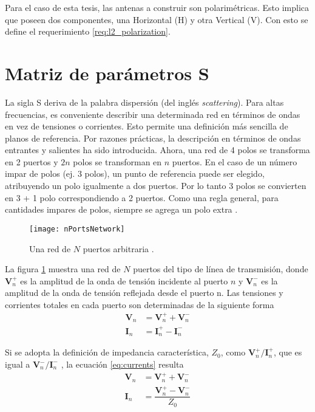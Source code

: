 Para el caso de esta tesis, las antenas a construir son polarimétricas. Esto implica que poseen dos componentes, una Horizontal (H) y otra Vertical (V). Con esto se define el requerimiento \ref{req:l2_polarization}.


\section{Matriz de parámetros S} 

La sigla S deriva de la palabra dispersión (del inglés \textit{scattering}). Para altas frecuencias, es conveniente describir una determinada red en términos de ondas en vez de tensiones o corrientes. Esto permite una definición más sencilla de planos de referencia. Por razones prácticas, la descripción en términos de ondas entrantes y salientes ha sido introducida. Ahora, una red de 4 polos se transforma en 2 puertos y $2n$ polos se transforman en $n$ puertos. En el caso de un número impar de polos (ej. 3 polos), un punto de referencia puede ser elegido, atribuyendo un polo igualmente a dos puertos. Por lo tanto 3 polos se convierten en 3 + 1 polo correspondiendo a 2 puertos. Como una regla general, para cantidades impares de polos, siempre se agrega un polo extra \cite{Caspers}.

\begin{figure}[H]
 \centering
 \texttt{[image: nPortsNetwork]}
 \caption{Una red de $N$ puertos arbitraria \cite{Pozar2012}.}
 \label{fig:nPortsNetwork}
\end{figure}

La figura \ref{fig:nPortsNetwork} muestra una red de $N$ puertos del tipo de línea de transmisión, donde $\bm{V}_n^+$ es la amplitud de la onda de tensión incidente al puerto $n$ y $\bm{V}_n^-$ es la amplitud de la onda de tensión reflejada desde el puerto n. Las tensiones y corrientes totales en cada puerto son determinadas de la siguiente forma
\begin{equation}\label{eq:currents}
\begin{aligned}
  \bm{V}_n &= \bm{V}_n^+ + \bm{V}_n^-\\
  \bm{I}_n &= \bm{I}_n^+ - \bm{I}_n^-
\end{aligned}
\end{equation}

Si se adopta la definición de impedancia característica, $Z_0$, como $\bm{V}_n^+/ \bm{I}_n^+$, que es igual a $\bm{V}_n^-/ \bm{I}_n^-$ \cite{Pozar2012}, la ecuación \ref{eq:currents} resulta
\begin{equation}\label{eq:voltages}
\begin{aligned}
  \bm{V}_n &= \bm{V}_n^+ + \bm{V}_n^-\\
  \bm{I}_n &= \dfrac{\bm{V}_n^+ - \bm{V}_n^-}{Z_0}
\end{aligned}
\end{equation}

